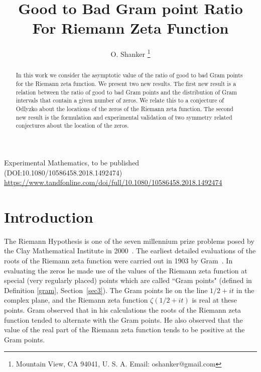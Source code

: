 \documentclass[twoside]{article}
\theoremstyle{definition}
\begin{document}
\date{}
\lhead[]{}
\chead[]{}
\rhead[]{}

\title{\bf{Good to Bad Gram point Ratio For Riemann Zeta Function}}
%

\author{O. Shanker 
 \thanks{Mountain View, CA 94041, U. S. A. Email: oshanker@gmail.com
}
}


\maketitle
\thispagestyle{fancy}

\begin{abstract}
In this work we consider the asymptotic value of the ratio of good to bad Gram points for the Riemann zeta function.
We present two new results. The first new result is a relation between the ratio of good to bad Gram points and the distribution of Gram intervals that contain a given number of zeros.
We relate this to a conjecture of Odlyzko about the locations of the zeros of the Riemann zeta function.
The  second new result is the formulation and experimental validation of two 
symmetry related conjectures about the location of the zeros.
\end{abstract}


 
  Experimental Mathematics, to be published (DOI:10.1080/10586458.2018.1492474)
  \url{https://www.tandfonline.com/doi/full/10.1080/10586458.2018.1492474} 



{}


\section{Introduction}
The Riemann Hypothesis is one of the seven millennium prize problems posed by the Clay Mathematical Institute in 2000~\cite{Sarnak 2005}. 
The earliest detailed evaluations of the roots of the Riemann zeta function were carried out in 1903 by Gram~\cite{Gram 1903}.
In evaluating the zeros he made use of the values of the Riemann zeta function at special (very regularly placed) points which are called ``Gram points"
{(defined in Definition \ref{gram}, Section~\ref{sec3})}.
The Gram points lie on the line $1/2+it$ in the complex plane, and the Riemann zeta function $\zeta(1/2+it)$ is real at these points. 
Gram observed that in his calculations the roots of the Riemann zeta function tended to alternate with the Gram points. He also observed that the
value of the real part of the Riemann zeta function tends to be positive at the Gram points. 
\end{document}
